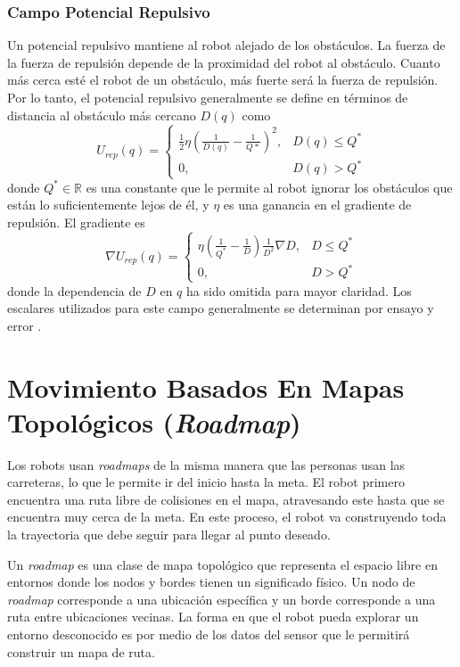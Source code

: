 \subsubsection{Campo Potencial Repulsivo}
Un potencial repulsivo mantiene al robot alejado de los obst\'aculos. La fuerza de la fuerza de repulsi\'on depende de la proximidad del robot al obst\'aculo. Cuanto m\'as cerca est\'e el robot de un obst\'aculo, m\'as fuerte ser\'a la fuerza de repulsi\'on. Por lo tanto, el potencial repulsivo generalmente se define en t\'erminos de distancia al obst\'aculo m\'as cercano $D(q)$ como 
\begin{equation}
U_{rep}(q) =
\begin{cases}
	\frac{1}{2}\eta(\frac{1}{D(q)} - \frac{1}{Q*})^2, & D(q)\leq Q^* \\
	0, & D(q) > Q^*
\end{cases}
\label{eq:pot_rep}
\end{equation}
donde $Q^* \in \mathbb R$ es una constante que le permite al robot ignorar los obst\'aculos que est\'an lo suficientemente lejos de \'el, y $\eta$ es una ganancia en el gradiente de repulsi\'on. El gradiente es 
\begin{equation}
\nabla U_{rep}(q) =
\begin{cases}
	\eta(\frac{1}{Q^*} - \frac{1}{D})\frac{1}{D^2} \nabla D, & D \leq Q^* \\
	0, & D > Q^*
\end{cases}
\label{eqn:gradient_rep}
\end{equation}
donde la dependencia de $D$ en $q$ ha sido omitida para mayor claridad. Los escalares utilizados para este campo generalmente se determinan por ensayo y error \cite{choset2005principles}.

\section{Movimiento Basados En Mapas Topol\'ogicos (\textit{Roadmap})}

Los robots usan \textit{roadmaps} de la misma manera que las personas usan las carreteras, lo que le permite ir del inicio hasta la meta. El robot primero encuentra una ruta libre de colisiones en el mapa, atravesando este hasta que se encuentra muy cerca de la meta. En este proceso, el robot va construyendo toda la trayectoria que debe seguir para llegar al punto deseado. 

Un \textit{roadmap} es una clase de mapa topol\'ogico que representa el espacio libre en entornos \cite{choset2005RoadMap} donde los nodos y bordes tienen un significado f\'isico. Un nodo de \textit{roadmap} corresponde a una ubicaci\'on espec\'ifica y un borde corresponde a una ruta entre ubicaciones vecinas. La forma en que el robot pueda explorar un entorno desconocido es por medio de los datos del sensor que le permitir\'a construir un mapa de ruta.

